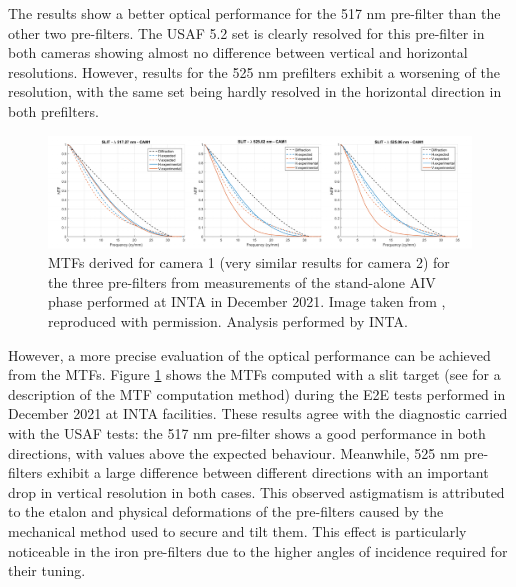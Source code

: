 The results show a better optical performance for the 517 nm pre-filter than the other two pre-filters. The USAF 5.2 set is clearly resolved for this pre-filter in both cameras showing almost no difference between vertical and horizontal resolutions. However, results for the 525 nm prefilters exhibit a worsening of the resolution, with the same set being hardly resolved in the horizontal direction in both prefilters. 

\begin{figure}[t]
    \includegraphics[width=\textwidth]{figures/TuMag/mtfs.pdf}
    \caption[TuMag's MTFs.]{MTFs derived for camera 1 (very similar results for camera 2) for the three pre-filters from measurements of the stand-alone AIV phase performed at INTA in December 2021. Image taken from \citep{tumag}, reproduced with permission. Analysis performed by INTA. 
      \label{fig_tumag:mtfs}}
\end{figure}


However, a more precise evaluation of the optical performance can be achieved from the MTFs. Figure \ref{fig_tumag:mtfs} shows the MTFs computed with a slit target (see \citealt{slanted-method} for a description of the MTF computation method) during the E2E tests performed in December 2021 at INTA facilities. These results agree with the diagnostic carried with the USAF tests: the 517 nm pre-filter shows a good performance in both directions, with values above the expected behaviour. Meanwhile, 525 nm pre-filters exhibit a large difference between different directions with an important drop in vertical resolution in both cases. This observed astigmatism is attributed to the etalon and physical deformations of the pre-filters caused by the mechanical method used to secure and tilt them. This effect is particularly noticeable in the iron pre-filters due to the higher angles of incidence required for their tuning.

